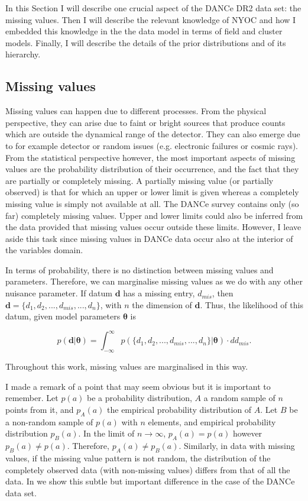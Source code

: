 In this Section I will describe one crucial aspect of the DANCe DR2 data set: the missing values. Then I will describe the relevant knowledge of NYOC and how I embedded this knowledge in the the data model in terms of field and cluster models. Finally, I will describe the details of the prior distributions and of its hierarchy. 



\subsection{Missing values}
\label{sect:missing}
Missing values can happen due to different processes. From the physical perspective, they can arise due to faint or bright sources that produce counts which are outside the dynamical range of the detector. They can also emerge due to for example detector or random issues (e.g. electronic failures or cosmic rays). From the statistical perspective however, the most important aspects of missing values are the probability distribution of their occurrence, and the fact that they are partially or completely missing. A partially missing value (or partially observed) is that for which an upper or lower limit is given whereas a completely missing value is simply not available at all. The DANCe survey contains only (so far) completely missing values. Upper and lower limits could also be inferred from the data provided that missing values occur outside these limits. However, I leave aside this task since missing values in DANCe data occur also at the interior of the variables domain.

In terms of probability, there is no distinction between missing values and parameters. Therefore, we can marginalise missing values as we do with any other nuisance parameter. If datum $\mathbf{d}$ has a missing entry, $d_{mis}$, then $\mathbf{d}=\{d_1,d_2,...,d_{mis},...,d_n\}$, with $n$ the dimension of $\mathbf{d}$. Thus, the likelihood of this datum, given model parameters $\mathbf{\theta}$ is

\begin{equation}
\label{eq:marginalmiss}
p(\mathbf{d}|\mathbf{\theta})= \int_{-\infty}^{\infty} p(\{d_1,d_2,...,d_{mis},...,d_n\}|\mathbf{\theta})\cdot d d_{mis}.
\end{equation}

Throughout this work, missing values are marginalised in this way.

I made a remark of a point that may seem obvious but it is important to remember. Let $p(a)$ be a probability distribution, $A$ a random sample of $n$ points from it, and $p_A(a)$ the empirical probability distribution of $A$. Let $B$ be a non-random sample of $p(a)$ with $n$ elements, and empirical probability distribution $p_B(a)$. In the limit of $n\rightarrow \infty$, $p_A(a)=p(a)$ however $p_B(a)\neq p(a)$. Therefore, $p_A(a)\neq p_B(a)$. Similarly, in data with missing values, if the missing value pattern is not random, the distribution of the completely observed data (with non-missing values) differs from that of all the data. In \citet{Olivares2017} we show this subtle but important difference in the case of the DANCe data set. 

